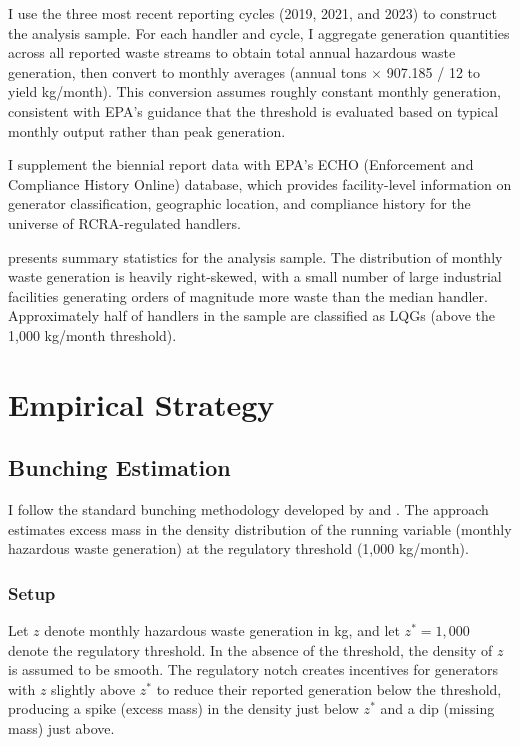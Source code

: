 \documentclass[12pt]{article}
\begin{document}
I use the three most recent reporting cycles (2019, 2021, and 2023) to construct the analysis sample. For each handler and cycle, I aggregate generation quantities across all reported waste streams to obtain total annual hazardous waste generation, then convert to monthly averages (annual tons $\times$ 907.185 / 12 to yield kg/month). This conversion assumes roughly constant monthly generation, consistent with EPA's guidance that the threshold is evaluated based on typical monthly output rather than peak generation.

I supplement the biennial report data with EPA's ECHO (Enforcement and Compliance History Online) database, which provides facility-level information on generator classification, geographic location, and compliance history for the universe of RCRA-regulated handlers.



 presents summary statistics for the analysis sample. The distribution of monthly waste generation is heavily right-skewed, with a small number of large industrial facilities generating orders of magnitude more waste than the median handler. Approximately half of handlers in the sample are classified as LQGs (above the 1,000 kg/month threshold).


\section{Empirical Strategy}
\label{sec:strategy}

\subsection{Bunching Estimation}

I follow the standard bunching methodology developed by \citet{saez2010} and \citet{kleven2013}. The approach estimates excess mass in the density distribution of the running variable (monthly hazardous waste generation) at the regulatory threshold (1,000 kg/month).

\subsubsection*{Setup} Let $z$ denote monthly hazardous waste generation in kg, and let $z^* = 1{,}000$ denote the regulatory threshold. In the absence of the threshold, the density of $z$ is assumed to be smooth. The regulatory notch creates incentives for generators with $z$ slightly above $z^*$ to reduce their reported generation below the threshold, producing a spike (excess mass) in the density just below $z^*$ and a dip (missing mass) just above.
\end{document}
